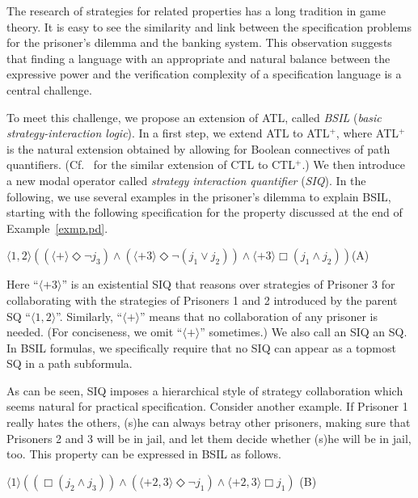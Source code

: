 \documentclass[11pt]{article}
\newcommand{\pfrr}{\Box}
\newcommand{\pevt}{\Diamond}
\begin{document}
The research of strategies for related properties has a long tradition in game theory.  
It is easy to 
see the similarity and link between the specification problems for the prisoner's dilemma and the banking system. 
This observation suggests that finding a language with an appropriate and natural 
balance between the expressive power and the verification complexity of a specification language is a central challenge.

To meet this challenge, we propose an extension of ATL,
called {\em BSIL} ({\em basic strategy-interaction logic}).
In a first step, we extend ATL to ATL$^+$, where ATL$^+$ is the natural extension obtained by allowing for Boolean connectives of path quantifiers.
(Cf.~\cite{BPM83,EC80} for the similar extension of CTL to CTL$^+$.)
We then introduce a new modal operator 
called {\em strategy interaction quantifier} ({\em SIQ}). 
In the following, we use several examples in the prisoner's dilemma 
to explain BSIL, starting with the following specification for the property discussed at the end of Example~\ref{exmp.pd}. 
\begin{center} 
\hfill $\langle 1,2\rangle((\langle+\rangle\pevt\neg j_3)\wedge 
	(\langle +3\rangle \pevt\neg (j_1\vee j_2))
	\wedge \langle+3\rangle \pfrr (j_1\wedge j_2))
$\hfill (A) 
\end{center} 
Here ``$\langle+3\rangle$'' is an existential SIQ that reasons over 
strategies of Prisoner 3 for collaborating with the strategies  
of Prisoners 1 and 2 introduced by the parent SQ ``$\langle 1,2\rangle$''. 
Similarly, ``$\langle+\rangle$'' means that 
no collaboration of any prisoner is needed. 
(For conciseness, we omit ``$\langle+\rangle$'' sometimes.)  
We also call an SIQ an SQ.  
In BSIL formulas, we specifically require that no SIQ can appear 
as a topmost SQ in a path subformula.  

As can be seen, SIQ imposes a hierarchical style of strategy collaboration 
which seems natural for practical specification.  
Consider another example.  
If Prisoner 1 really hates the others, 
(s)he can always betray other prisoners,  
making sure that Prisoners 2 and 3 will be in jail, and let them 
decide whether (s)he will be in jail, too.  
This property can be expressed in BSIL as follows. 
\begin{center} 
\hfill 
$\langle 1\rangle((\pfrr (j_2\wedge j_3))\wedge 
	(\langle +2,3\rangle \pevt\neg j_1)
	\wedge \langle+2,3\rangle \pfrr j_1)
$
\hfill (B) 
\end{center} 
\end{document}
